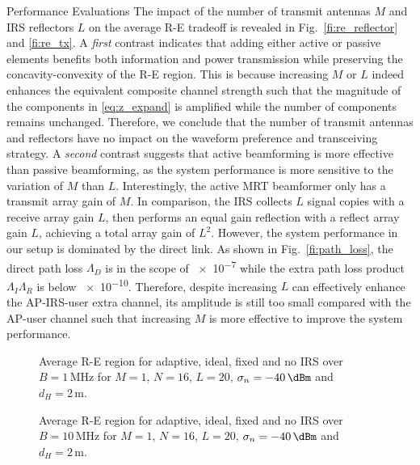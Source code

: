 \documentclass[journal]{IEEEtran}
\begin{document}
\begin{section}{Performance Evaluations}
		The impact of the number of transmit antennas $M$ and IRS reflectors $L$ on the average R-E tradeoff is revealed in Fig.~\ref{fi:re_reflector} and \ref{fi:re_tx}. A \textit{first} contrast indicates that adding either active or passive elements benefits both information and power transmission while preserving the concavity-convexity of the R-E region. This is because increasing $M$ or $L$ indeed enhances the equivalent composite channel strength such that the magnitude of the components in \ref{eq:z_expand} is amplified while the number of components remains unchanged. Therefore, we conclude that the number of transmit antennas and reflectors have no impact on the waveform preference and transceiving strategy. A \textit{second} contrast suggests that active beamforming is more effective than passive beamforming, as the system performance is more sensitive to the variation of $M$ than $L$. Interestingly, the active MRT beamformer only has a transmit array gain of $M$. In comparison, the IRS collects $L$ signal copies with a receive array gain $L$, then performs an equal gain reflection with a reflect array gain $L$, achieving a total array gain of $L^2$. However, the system performance in our setup is dominated by the direct link. As shown in Fig.~\ref{fi:path_loss}, the direct path loss $\Lambda_D$ is in the scope of \num{e-7} while the extra path loss product $\Lambda_I\Lambda_R$ is below \num{e-10}. Therefore, despite increasing $L$ can effectively enhance the AP-IRS-user extra channel, its amplitude is still too small compared with the AP-user channel such that increasing $M$ is more effective to improve the system performance.

		\begin{figure}[!t]
			\centering
			\begin{adjustbox}{width=\linewidth}
				
			\end{adjustbox}
			\caption{Average R-E region for adaptive, ideal, fixed and no IRS over $B=1\,\si{\MHz}$ for $M=1$, $N=16$, $L=20$, $\sigma_n=-40\,\si{\dBm}$ and $d_H=2\,\si{\meter}$.}
			\label{fi:re_irs_1mhz}
		\end{figure}

		\begin{figure}[!t]
			\centering
			\begin{adjustbox}{width=\linewidth}
				
			\end{adjustbox}
			\caption{Average R-E region for adaptive, ideal, fixed and no IRS over $B=10\,\si{\MHz}$ for $M=1$, $N=16$, $L=20$, $\sigma_n=-40\,\si{\dBm}$ and $d_H=2\,\si{\meter}$.}
			\label{fi:re_irs_10mhz}
		\end{figure}


\end{section}
\end{document}
